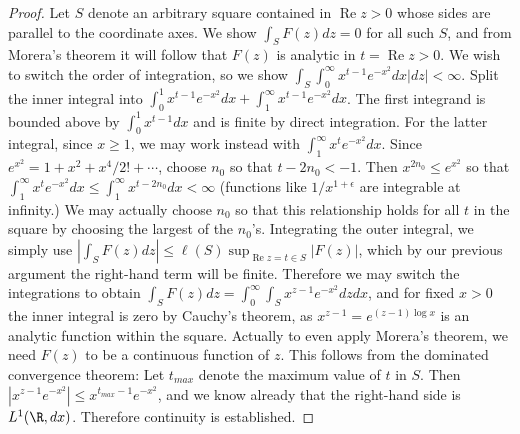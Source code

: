 \documentclass[11pt]{book}
\theoremstyle{definition}
\renewcommand{\Re}{\operatorname{Re}}
\begin{document}
\begin{enumerate}
\begin{proof}
Let $S$ denote an arbitrary square contained in $\Re z>0$ whose sides are parallel to the coordinate axes. We show $\int_S F(z)dz=0$ for all such $S$, and from Morera's theorem it will follow that $F(z)$ is analytic in $t=\Re z>0$. We wish to switch the order of integration, so we show $\int_S \int_0^{\infty} x^{t-1}e^{-x^2}dx|dz|<\infty$. Split the inner integral into $\int_0^1 x^{t-1}e^{-x^2}dx+\int_1^{\infty} x^{t-1}e^{-x^2}dx$. The first integrand is bounded above by $\int_0^1 x^{t-1}dx$ and is finite by direct integration. For the latter integral, since $x\geq 1$, we may work instead with $\int_1^{\infty} x^te^{-x^2}dx$. Since $e^{x^2}=1+x^2+x^4/2!+\cdots$, choose $n_0$ so that $t-2n_0<-1$. Then $x^{2n_0}\leq e^{x^2}$ so that $\int_1^{\infty} x^te^{-x^2}dx \leq \int_1^\infty x^{t-2n_0}dx < \infty$ (functions like $1/x^{1+\epsilon}$ are integrable at infinity.) We may actually choose $n_0$ so that this relationship holds for all $t$ in the square by choosing the largest of the $n_0$'s. Integrating the outer integral, we simply use $|\int_S F(z)dz|\leq \ell(S)\sup_{\Re z=t\in S}|F(z)|$, which by our previous argument the right-hand term will be finite. Therefore we may switch the integrations to obtain $\int_S F(z)dz = \int _0^{\infty}\int_S x^{z-1}e^{-x^2}dzdx$, and for fixed $x>0$ the inner integral is zero by Cauchy's theorem, as $x^{z-1}=e^{(z-1)\log x}$ is an analytic function within the square. Actually to even apply Morera's theorem, we need $F(z)$ to be a continuous function of $z$. This follows from the dominated convergence theorem: Let $t_{max}$ denote the maximum value of $t$ in $S$. Then $|x^{z-1}e^{-x^2}|\leq x^{t_{max}-1}e^{-x^2}$, and we know already that the right-hand side is $L^1(\R,dx)$. Therefore continuity is established.
\end{proof}
\end{enumerate}
\end{document}
